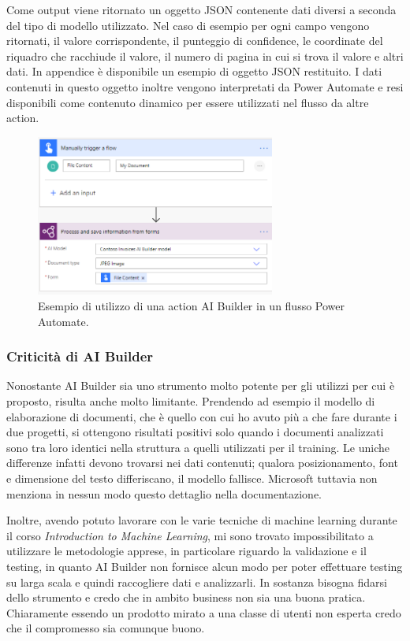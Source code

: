 Come output viene ritornato un oggetto JSON contenente dati diversi a seconda del tipo di modello utilizzato. Nel caso di esempio per ogni campo vengono ritornati, il valore corrispondente, il punteggio di confidence, le coordinate del riquadro che racchiude il valore, il numero di pagina in cui si trova il valore e altri dati. In appendice è disponibile un esempio di oggetto JSON restituito.
I dati contenuti in questo oggetto inoltre vengono interpretati da Power Automate e resi disponibili come contenuto dinamico per essere utilizzati nel flusso da altre action.

\begin{figure}[ht]
  \centering
  \includegraphics[width=0.7\textwidth]{flow-ai-builder.png}
  \caption{Esempio di utilizzo di una action AI Builder in un flusso Power Automate.}
  \label{fig:flowAIBuilder}
\end{figure}

\subsubsection{Criticità di AI Builder}
Nonostante AI Builder sia uno strumento molto potente per gli utilizzi per cui è proposto, risulta anche molto limitante. Prendendo ad esempio il modello di elaborazione di documenti, che è quello con cui ho avuto più a che fare durante i due progetti, si ottengono risultati positivi solo quando i documenti analizzati sono tra loro identici nella struttura a quelli utilizzati per il training. Le uniche differenze infatti devono trovarsi nei dati contenuti; qualora posizionamento, font e dimensione del testo differiscano, il modello fallisce. Microsoft tuttavia non menziona in nessun modo questo dettaglio nella documentazione.

Inoltre, avendo potuto lavorare con le varie tecniche di machine learning durante il corso \textit{Introduction to Machine Learning}, mi sono trovato impossibilitato a utilizzare le metodologie apprese, in particolare riguardo la validazione e il testing, in quanto AI Builder non fornisce alcun modo per poter effettuare testing su larga scala e quindi raccogliere dati e analizzarli. In sostanza bisogna fidarsi dello strumento e credo che in ambito business non sia una buona pratica. Chiaramente essendo un prodotto mirato a una classe di utenti non esperta credo che il compromesso sia comunque buono.






